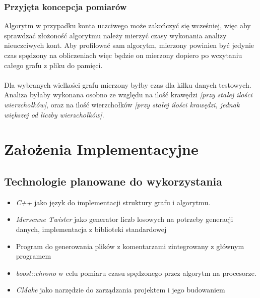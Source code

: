 \documentclass[11pt]{article}
\newcommand{\+}{\discretionary{\mbox{\scriptsize$\hookleftarrow$}}{}{}}
\begin{document}
\subsubsection{Przyjęta koncepcja pomiarów}
Algorytm w przypadku konta uczciwego może zakończyć się wcześniej, więc aby sprawdzać złożoność algorytmu należy mierzyć czasy wykonania analizy nieuczciwych kont. Aby profilować sam algorytm, mierzony powinien być jedynie czas spędzony na obliczeniach więc będzie on mierzony dopiero po wczytaniu całego grafu z pliku do pamięci. \\\\
Dla wybranych wielkości grafu mierzony byłby czas dla kilku danych testowych. Analiza byłaby wykonana osobno ze względu na ilość krawędzi \textsl{[przy stałej ilości wierzchołków]}, oraz na ilość wierzchołków \textsl{[przy stałej ilości krawędzi, jednak większej od liczby wierzchołków]}.
\section{Założenia Implementacyjne}
\subsection{Technologie planowane do wykorzystania}
\begin{itemize}
\item
\textsl{C++} jako język do implementacji struktury grafu i algorytmu.
\item
\textsl{Mersenne Twister} jako generator liczb losowych na potrzeby generacji danych, implementacja z biblioteki standardowej
\item
Program do generowania plików z komentarzami zintegrowany z głównym programem
\item
\textsl{boost::chrono} w celu pomiaru czasu spędzonego przez algorytm na procesorze. 
\item
\textsl{CMake} jako narzędzie do zarządzania projektem i jego budowaniem
\end{itemize}
\end{document}
